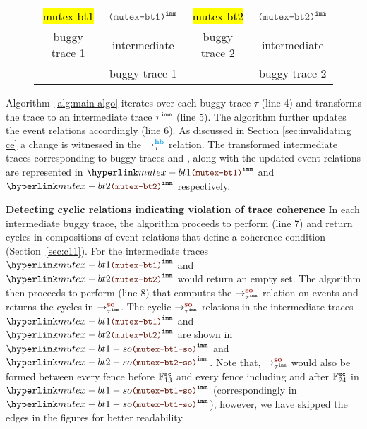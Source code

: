 \begin{figure}[!h]
	\begin{tabular}{|c|c|c|c|}
		\hline
		\resizebox{0.24\textwidth}{!}{} &
		\resizebox{0.24\textwidth}{!}{} &
		\resizebox{0.24\textwidth}{!}{} &
		\resizebox{0.24\textwidth}{!}{} \\
		\hline
		
		\multicolumn{1}{c}{\hl{mutex-bt1}} &
		\multicolumn{1}{c}{$\imm{\hl{mutex-bt1}}$}  &
		\multicolumn{1}{c}{\hl{mutex-bt2}} &
		\multicolumn{1}{c}{$\imm{\hl{mutex-bt2}}$} \\
		
		\multicolumn{1}{c}{buggy trace 1} &
		\multicolumn{1}{c}{intermediate} &
		\multicolumn{1}{c}{buggy trace 2} &
		\multicolumn{1}{c}{intermediate} \\
	
		\multicolumn{1}{c}{} &
		\multicolumn{1}{c}{buggy trace 1} &
		\multicolumn{1}{c}{} &
		\multicolumn{1}{c}{buggy trace 2} \\
	\end{tabular}
\end{figure}

Algorithm~\ref{alg:main algo} iterates over each buggy trace
$\tau$ (line 4) and transforms the trace to an intermediate 
trace $\imm{\tau}$ (line 5). The algorithm further updates the 
event relations accordingly (line 6). As discussed in Section
\ref{sec:invalidating ce} a change is witnessed in the 
$\setHB$ relation. The transformed intermediate traces 
corresponding to buggy traces  and 
, along with the updated event relations are 
represented in $\imm{\hlref{mutex-bt1}}$ and 
$\imm{\hlref{mutex-bt2}}$ respectively.

\noindent
{\bf Detecting cyclic relations indicating violation of 
	trace coherence}
In each intermediate buggy trace, the algorithm proceeds 
to perform \wkfence (line 7) and return cycles in compositions 
of event relations that define a coherence condition 
(Section~\ref{sec:c11}). For the intermediate traces 
$\imm{\hlref{mutex-bt1}}$ and $\imm{\hlref{mutex-bt2}}$
\wkfence would return an empty set.
%
The algorithm then proceeds to perform \stfence (line 8) that 
computes the $\so{\imm{\tau}}{}{}$ relation on \sc 
events and returns the cycles in $\so{\imm{\tau}}{}{}$.
The cyclic $\so{\imm{\tau}}{}{}$ relations in the intermediate
traces $\imm{\hlref{mutex-bt1}}$ and $\imm{\hlref{mutex-bt2}}$
are shown in $\imm{\hlref{mutex-bt1-so}}$ and 
$\imm{\hlref{mutex-bt2-so}}$. Note that, $\so{\imm{\tau}}{}{}$ 
would also be formed between every fence before 
$\mathbb{F}^\sc_{13}$ and every fence including and after 
$\mathbb{F}^\sc_{24}$ in $\imm{\hlref{mutex-bt1-so}}$ 
(correspondingly in $\imm{\hlref{mutex-bt1-so}}$), however, we 
have skipped the edges in the figures for better readability.

